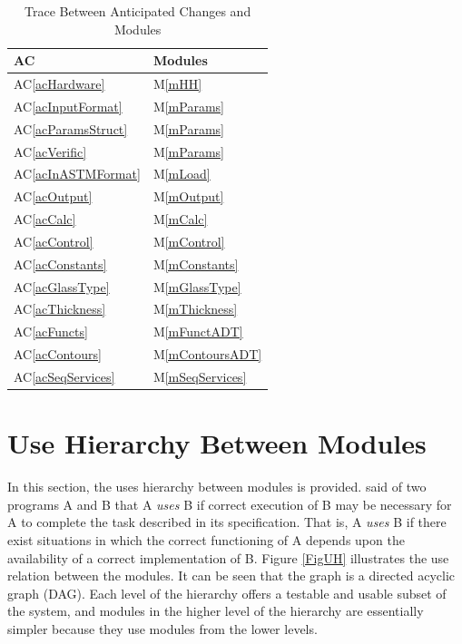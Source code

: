 \documentclass[12pt]{article}
\newcommand{\acref}[1]{AC\ref{#1}}
\newcommand{\mref}[1]{M\ref{#1}}
\begin{document}
\begin{table}[H]
\centering
\begin{tabular}{p{} p{}}
\toprule
\textbf{AC} & \textbf{Modules}\\
\midrule
\acref{acHardware} & \mref{mHH}\\
\acref{acInputFormat} & \mref{mParams}\\
\acref{acParamsStruct} & \mref{mParams}\\
\acref{acVerific} & \mref{mParams}\\
\acref{acInASTMFormat} & \mref{mLoad}\\
\acref{acOutput} & \mref{mOutput}\\
\acref{acCalc} & \mref{mCalc}\\
\acref{acControl} & \mref{mControl}\\
\acref{acConstants} & \mref{mConstants}\\
\acref{acGlassType} & \mref{mGlassType}\\
\acref{acThickness} & \mref{mThickness}\\
\acref{acFuncts} & \mref{mFunctADT}\\
\acref{acContours} & \mref{mContoursADT}\\
\acref{acSeqServices} & \mref{mSeqServices}\\
\bottomrule
\end{tabular}
\caption{Trace Between Anticipated Changes and Modules}
\label{TblAC}
\end{table}
\section{Use Hierarchy Between Modules} \label{SecUse}

In this section, the uses hierarchy between modules is
provided. \citet{Parnas1978} said of two programs A and B that A {\em uses} B if
correct execution of B may be necessary for A to complete the task described in
its specification. That is, A {\em uses} B if there exist situations in which
the correct functioning of A depends upon the availability of a correct
implementation of B.  Figure \ref{FigUH} illustrates the use relation between
the modules. It can be seen that the graph is a directed acyclic graph
(DAG). Each level of the hierarchy offers a testable and usable subset of the
system, and modules in the higher level of the hierarchy are essentially simpler
because they use modules from the lower levels.
\end{document}
